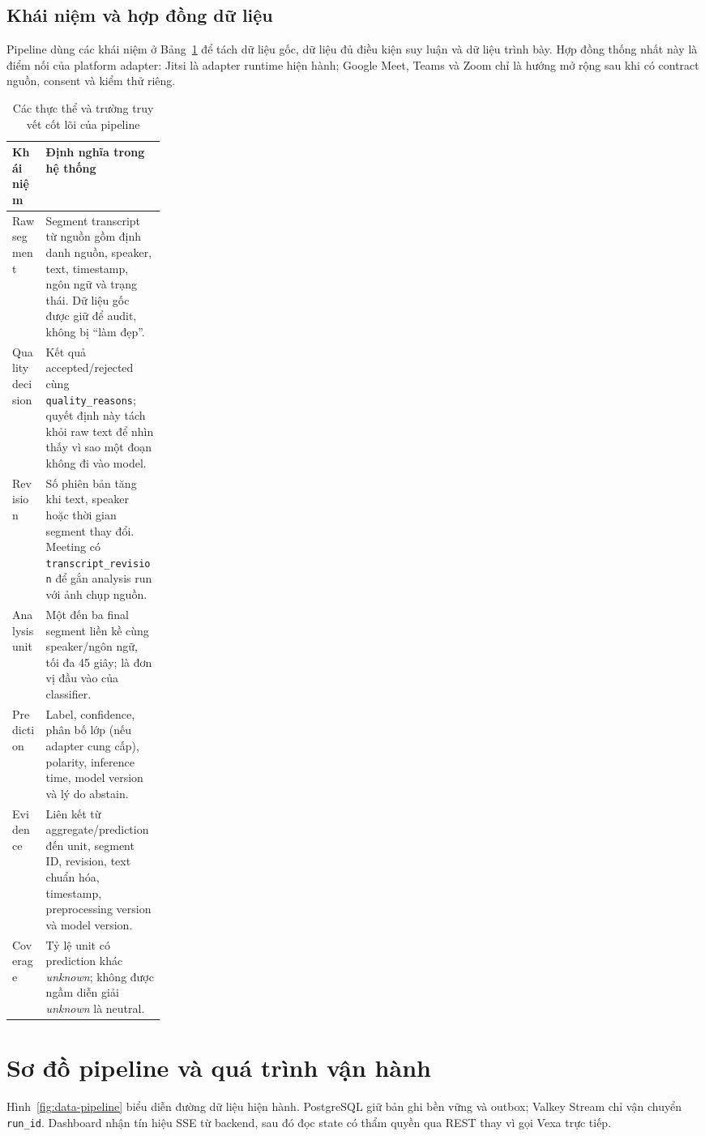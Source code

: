\subsection{Khái niệm và hợp đồng dữ liệu}
Pipeline dùng các khái niệm ở Bảng~\ref{tab:data-contract} để tách dữ liệu gốc, dữ liệu đủ điều kiện suy luận và dữ liệu trình bày. Hợp đồng thống nhất này là điểm nối của platform adapter: Jitsi là adapter runtime hiện hành; Google Meet, Teams và Zoom chỉ là hướng mở rộng sau khi có contract nguồn, consent và kiểm thử riêng.

\begin{table}[H]
\centering
\caption{Các thực thể và trường truy vết cốt lõi của pipeline}
\label{tab:data-contract}
\begin{tabularx}{\linewidth}{p{0.22\linewidth}X}
\toprule
Khái niệm & Định nghĩa trong hệ thống \\ \midrule
Raw segment & Segment transcript từ nguồn gồm định danh nguồn, speaker, text, timestamp, ngôn ngữ và trạng thái. Dữ liệu gốc được giữ để audit, không bị ``làm đẹp''. \\
Quality decision & Kết quả accepted/rejected cùng \texttt{quality\_reasons}; quyết định này tách khỏi raw text để nhìn thấy vì sao một đoạn không đi vào model. \\
Revision & Số phiên bản tăng khi text, speaker hoặc thời gian segment thay đổi. Meeting có \texttt{transcript\_revision} để gắn analysis run với ảnh chụp nguồn. \\
Analysis unit & Một đến ba final segment liền kề cùng speaker/ngôn ngữ, tối đa 45 giây; là đơn vị đầu vào của classifier. \\
Prediction & Label, confidence, phân bố lớp (nếu adapter cung cấp), polarity, inference time, model version và lý do abstain. \\
Evidence & Liên kết từ aggregate/prediction đến unit, segment ID, revision, text chuẩn hóa, timestamp, preprocessing version và model version. \\
Coverage & Tỷ lệ unit có prediction khác \textit{unknown}; không được ngầm diễn giải \textit{unknown} là neutral. \\
\bottomrule
\end{tabularx}
\end{table}

\section{Sơ đồ pipeline và quá trình vận hành}
Hình~\ref{fig:data-pipeline} biểu diễn đường dữ liệu hiện hành. PostgreSQL giữ bản ghi bền vững và outbox; Valkey Stream chỉ vận chuyển \texttt{run\_id}. Dashboard nhận tín hiệu SSE từ backend, sau đó đọc state có thẩm quyền qua REST thay vì gọi Vexa trực tiếp.

